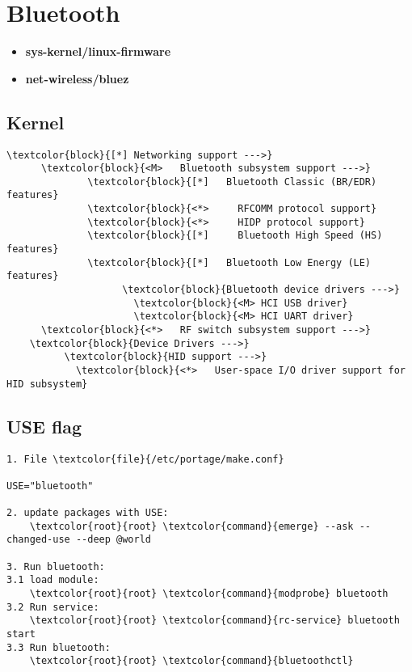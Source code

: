 \documentclass[10pt, a4paper, onecolumn, openany]{book}         %
\begin{document}
\section{Bluetooth}
\begin{itemize}
    \item \textbf{sys-kernel/linux-firmware}
    \item \textbf{net-wireless/bluez}
\end{itemize}
\subsection{Kernel}
\begin{Verbatim}[commandchars=\\\{\}]
\textcolor{block}{[*] Networking support --->}
      \textcolor{block}{<M>   Bluetooth subsystem support --->}
              \textcolor{block}{[*]   Bluetooth Classic (BR/EDR) features}
              \textcolor{block}{<*>     RFCOMM protocol support}
              \textcolor{block}{<*>     HIDP protocol support}
              \textcolor{block}{[*]     Bluetooth High Speed (HS) features}
              \textcolor{block}{[*]   Bluetooth Low Energy (LE) features}
                    \textcolor{block}{Bluetooth device drivers --->}
                      \textcolor{block}{<M> HCI USB driver}
                      \textcolor{block}{<M> HCI UART driver}
      \textcolor{block}{<*>   RF switch subsystem support --->}
    \textcolor{block}{Device Drivers --->}
          \textcolor{block}{HID support --->}
            \textcolor{block}{<*>   User-space I/O driver support for HID subsystem}
\end{Verbatim}
\subsection{USE flag}
\begin{Verbatim}[commandchars=\\\{\}]
1. File \textcolor{file}{/etc/portage/make.conf}

USE="bluetooth"

2. update packages with USE:
    \textcolor{root}{root} \textcolor{command}{emerge} --ask --changed-use --deep @world

3. Run bluetooth:
3.1 load module:
    \textcolor{root}{root} \textcolor{command}{modprobe} bluetooth
3.2 Run service:
    \textcolor{root}{root} \textcolor{command}{rc-service} bluetooth start
3.3 Run bluetooth:
    \textcolor{root}{root} \textcolor{command}{bluetoothctl}
\end{Verbatim}
\end{document}
